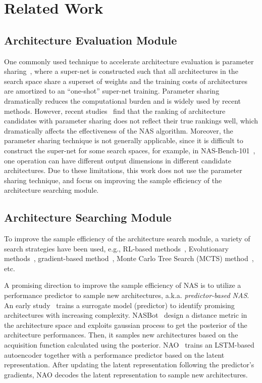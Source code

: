 \documentclass[runningheads]{llncs}
\begin{document}
\section{Related Work}
\label{sec:related_work}

\subsection{Architecture Evaluation Module}


One commonly used technique to accelerate architecture evaluation is parameter sharing~\cite{pham2018efficient}, where a super-net is constructed such that all architectures in the search space share a superset of weights and the training costs of architectures are amortized to an ``one-shot'' super-net training. Parameter sharing dramatically reduces the computational burden and is widely used by recent methods. However, recent studies~\cite{sciuto2019evaluating,luo2019understanding} find that the ranking of architecture candidates with parameter sharing does not reflect their true rankings well,
which dramatically affects the effectiveness of the NAS algorithm. Moreover, the parameter sharing technique is not generally applicable, 
since it is difficult to construct the super-net for some search spaces, for example, in NAS-Bench-101~\cite{ying2019bench}, 
one operation can have different output dimensions in different candidate architectures.
Due to these limitations, this work does not use the parameter sharing technique, and focus on improving the sample efficiency of the architecture searching module.

\subsection{Architecture Searching Module}
To improve the sample efficiency of the architecture search module, a variety of search strategies have been used, e.g., RL-based methods~\cite{zoph2016neural,pham2018efficient,guo2020}, Evolutionary methods~\cite{liu2017hierarchical,real2019regularized},
gradient-based method~\cite{darts,lian2019towards}, Monte Carlo Tree Search (MCTS) method~\cite{negrinho2017deeparchitect}, etc.


A promising direction to improve the sample efficiency of NAS is to utilize a performance predictor to sample new architectures, a.k.a. \textit{predictor-based NAS}. An early study~\cite{liu2018progressive} trains a surrogate model 
(predictor) to identify promising architectures with increasing complexity. NASBot~\cite{kandasamy2018bayesian} design a distance metric in the architecture space and exploits gaussian process to get the posterior of the architecture performances. Then, it samples new architectures based on the acquisition function calculated using the posterior.
NAO~\cite{nao2018} trains an LSTM-based autoencoder together with a performance predictor based on the latent representation. After updating the latent representation following the predictor's gradients, NAO decodes the latent representation to sample new architectures.
\end{document}
